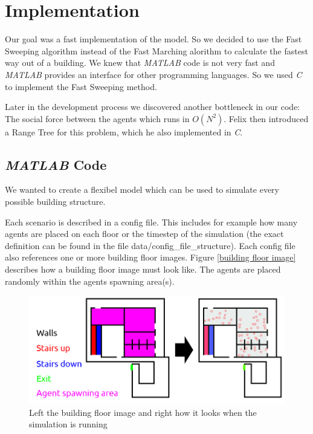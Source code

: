 \documentclass[11pt]{article}
\begin{document}



\section{Implementation}
Our goal was a fast implementation of the model. So we decided to use the Fast
Sweeping algorithm instead of the Fast Marching alorithm to calculate the
fastest way out of a building. We knew that \textit{MATLAB} code is not very fast and
\textit{MATLAB} provides an interface for other programming languages. So we
used \textit{C} to
implement the Fast Sweeping method.

Later in the development process we discovered another bottleneck in our code:
The social force between the agents which runs in $ O(N^2) $. Felix then
introduced a Range Tree for this problem, which he also implemented in
\textit{C}.

\subsection{\textit{MATLAB} Code} \label{matlab code}
We wanted to create a flexibel model which can be used to simulate every
possible building structure. 

Each scenario is described in a config file. This includes for example how many
agents are placed on each floor or the timestep of the simulation (the exact
definition can be found in the file data/config\_file\_structure). Each config
file also references one or more building floor images.
Figure \vref{building floor image} describes how a building floor
image must look like. The agents are placed randomly within the agents spawning
area(s).

\begin{figure}[h]
\centering
\includegraphics[width=\textwidth]{./images/config_floor_description.png}
\caption{Left the building floor image and right how it looks when the
simulation is running} 
\label{building floor image}
\end{figure}
\end{document}
